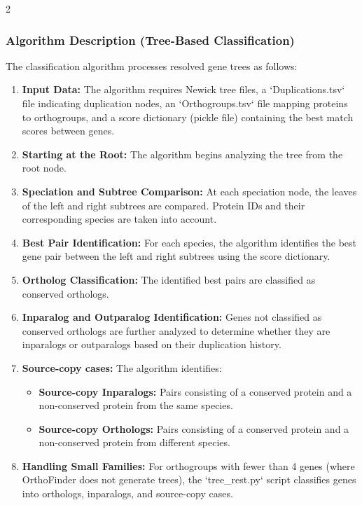 2\documentclass{article}
\begin{document}
\subsubsection{Algorithm Description (Tree-Based Classification)}
The classification algorithm processes resolved gene trees as follows:
\begin{enumerate}
    \item \textbf{Input Data:} The algorithm requires Newick tree files, a `Duplications.tsv` file indicating duplication nodes, an `Orthogroups.tsv` file mapping proteins to orthogroups, and a score dictionary (pickle file) containing the best match scores between genes.
    \item \textbf{Starting at the Root:} The algorithm begins analyzing the tree from the root node.
    \item \textbf{Speciation and Subtree Comparison:} At each speciation node, the leaves of the left and right subtrees are compared. Protein IDs and their corresponding species are taken into account.
    \item \textbf{Best Pair Identification:} For each species, the algorithm identifies the best gene pair between the left and right subtrees using the score dictionary.
    \item \textbf{Ortholog Classification:} The identified best pairs are classified as conserved orthologs.
    \item \textbf{Inparalog and Outparalog Identification:} Genes not classified as conserved orthologs are further analyzed to determine whether they are inparalogs or outparalogs based on their duplication history.
    \item \textbf{Source-copy cases:} The algorithm identifies:
    \begin{itemize}
        \item \textbf{Source-copy Inparalogs:} Pairs consisting of a conserved protein and a non-conserved protein from the same species.
        \item \textbf{Source-copy Orthologs:} Pairs consisting of a conserved protein and a non-conserved protein from different species.
    \end{itemize}
    \item \textbf{Handling Small Families:} For orthogroups with fewer than 4 genes (where OrthoFinder does not generate trees), the `tree\_rest.py` script classifies genes into orthologs, inparalogs, and source-copy cases.
\end{enumerate}
\end{document}
